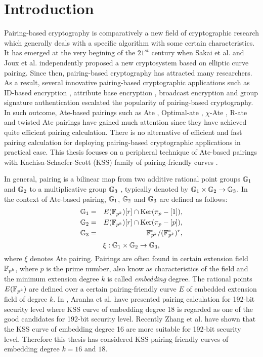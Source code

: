 \section{Introduction}
Pairing-based cryptography is comparatively a new field of cryptographic research which generally deals with a specific algorithm with  some certain characteristics.
It has emerged at the very begining of the $21^{st}$ century when Sakai et al. \cite{sakai2000cryptosystems} and Joux et al. \cite{JC:Joux04} independently proposed a new cryptosystem based on elliptic curve pairing.
Since then, pairing-based cryptography has attracted many researchers. 
As a result,  several innovative pairing-based cryptographic applications such as ID-based encryption \cite{sakai2000cryptosystems}, attribute base encryption \cite{EPRINT:SahWat04}, broadcast encryption \cite{C:BonGenWat05} and group signature authentication \cite{C:BonBoySha04} escalated the popularity of pairing-based cryptography.
In such outcome, Ate-based pairings such as Ate \cite{DBLP:reference/crc/2005ehcc}, Optimal-ate \cite{DBLP:journals/tit/Vercauteren10}, $\chi$-Ate \cite{PAIRING:NASKM08}, R-ate \cite{r_ate} and  twisted Ate  \cite{EPRINT:MKHO07} pairings have gained much attention since they have achieved quite efficient pairing calculation. 
There is no alternative of efficient and fast pairing calculation for deploying pairing-based cryptographic applications in practical case. 
This thesis focuses on a peripheral technique of Ate-based pairings with Kachisa-Schaefer-Scott (KSS) family of pairing-friendly curves \cite{EPRINT:KacSchSco07}. 

In general, pairing is a bilinear map from two additive rational point groups ${\mathbb{G}}_{1}$ and ${\mathbb{G}}_{2}$ to a multiplicative group ${\mathbb{G}}_{3}$ \cite{Silverman}, typically denoted by ${\mathbb{G}}_{1} \times {\mathbb{G}}_{2} \rightarrow {\mathbb{G}}_{3}$.
In the context of Ate-based pairing, ${\mathbb{G}}_{1}$, ${\mathbb{G}}_{2}$ and ${\mathbb{G}}_{3}$ are defined as follows:
\begin{eqnarray}\label{eq:g_1}
{\mathbb{G}}_{1} & = &  E({\mathbb{F}}_{p^{k}}) [r] \cap \text{Ker}(\pi_p - [1]), \nonumber \\
{\mathbb{G}}_{2} & = &  E({\mathbb{F}}_{p^{k}}) [r] \cap \text{Ker}(\pi_p - [p]), \nonumber \\
{\mathbb{G}}_{3} & = & {{\mathbb{F}}^{\ast}}_{\!\!\!p^{k}}/({{\mathbb{F}}^{\ast}}_{\!\!\!p^{k}})^r, \nonumber
\end{eqnarray}
\begin{equation}
\xi : {\mathbb{G}}_{1} \times {\mathbb{G}}_{2} \rightarrow {\mathbb{G}}_{3},  \nonumber
\end{equation}
where $\xi$ denotes Ate pairing. 
Pairings are often found in certain extension field $\mathbb{F}_{p^k}$, where $p$ is the prime number, also know as characteristics of the field and the minimum extension degree $k$ is called \textit{embedding} degree. 
The rational points $E(\mathbb{F}_{p^k})$ are defined over a certain pairing-friendly curve $E$ of embedded extension field of degree $k$. 
In \cite{PAIRING:AFKMR12}, Aranha et al. have presented pairing calculation for 192-bit security level where  KSS curve of embedding degree 18 is regarded as one of the good candidates for 192-bit security level.
Recently Zhang et al. \cite{INDOCRYPT:ZhaLin12} have shown that the KSS curve of embedding degree 16 are more suitable for 192-bit security level.
Therefore this thesis has considered KSS pairing-friendly curves of embedding degree $k=16$ and $18$.

